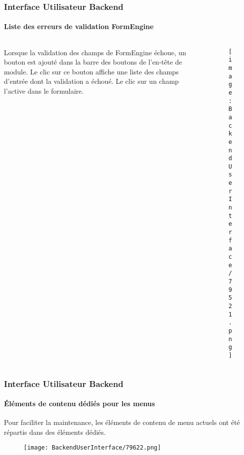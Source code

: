 \begin{frame}[fragile]
	\frametitle{Interface Utilisateur Backend}
	\framesubtitle{Liste des erreurs de validation FormEngine}

	\begin{columns}[T]
		\begin{column}{.35\textwidth}
			Lorsque la validation des champs de FormEngine échoue, un bouton est ajouté dans la
			barre des boutons de l'en-tête de module. Le clic sur ce bouton affiche une liste des
			champs d'entrée dont la validation a échoué. Le clic sur un champ l'active dans le
			formulaire.
		\end{column}

		\begin{column}{.65\textwidth}
			\begin{figure}\vspace*{-0.6cm}
				\texttt{[image: BackendUserInterface/79521.png]}
			\end{figure}
		\end{column}
	\end{columns}

\end{frame}

\begin{frame}[fragile]
	\frametitle{Interface Utilisateur Backend}
	\framesubtitle{Éléments de contenu dédiés pour les menus}

	Pour faciliter la maintenance, les éléments de contenu de menu actuels ont été
	répartis dans des éléments dédiés.

	\begin{figure}\vspace{-0.2cm}
		\texttt{[image: BackendUserInterface/79622.png]}
	\end{figure}

\end{frame}

